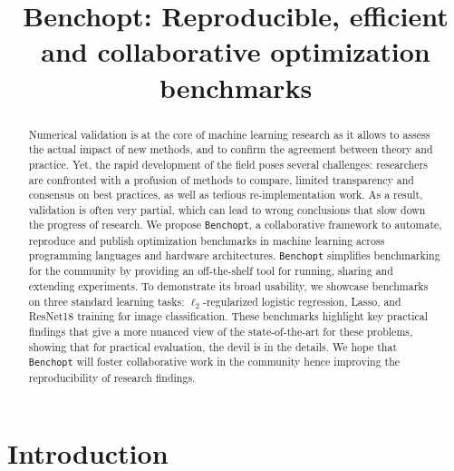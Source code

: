 \documentclass{article}
\title{Benchopt: Reproducible, efficient and collaborative optimization benchmarks}
\author{
  Thomas~Moreau$^{1,*}$,
  Mathurin~Massias$^{2,*}$,
  Alexandre~Gramfort$^{1,*}$,
  Pierre~Ablin$^{3}$,\\
  \textbf{
  Pierre-Antoine~Bannier, Benjamin~Charlier$^{4}$,
  Mathieu~Dagréou$^{1}$,
  Tom~Dupré~la~Tour$^{6}$,}\\
  \textbf{
  Ghislain~Durif$^{4}$,
  Cassio~F.~Dantas$^{7}$,
  Quentin~Klopfenstein$^{8}$,
  Johan~Larsson$^{9}$,
  En~Lai$^{1}$,}\\
  \textbf{
  Tanguy~Lefort$^{4}$,
  Benoit~Malézieux$^{1}$,
  Badr~Moufad$^{2}$,
  Binh~T.~Nguyen$^{10}$,
  Alain~Rakotomamonjy$^{11}$,}\\
  \textbf{
  Zaccharie~Ramzi$^{12}$,
  Joseph~Salmon$^{4,5}$,
  Samuel~Vaiter$^{13}$}\\[1em]
  $^1$ Université Paris-Saclay, Inria, CEA, 91120 Palaiseau, France\\
  $^2$ Univ Lyon, Inria, CNRS, ENS de Lyon, UCB Lyon 1, LIP UMR 5668, F-69342, Lyon, France\\
  $^3$ Université Paris-Dauphine, PSL University, CNRS, 75016, Paris, France\\
  $^4$ IMAG, Univ Montpellier, CNRS, Montpellier, France\quad
  $^{5}$ Institut Universitaire de France (IUF)\\
  \hskip-7ex
  $^6$ University of California, Berkeley, CA 94720, USA\quad
  $^{7}$ TETIS, Univ Montpellier, INRAE, Montpellier, France\\
  $^8$ University of Luxembourg, LCSB, Esch-sur-Alzette, Luxembourg\\
  $^9$ The Department of Statistics, Lund University\quad
  $^{10}$ LTCI, Télécom Paris, 91120 Palaiseau, France\\
  $^{11}$ Criteo AI Lab, Paris, France\quad
  $^{12}$ ENS Ulm, CNRS, UMR 8553, Paris, France\\
  $^{13}$ CNRS \& Université Côte d'Azur, Laboratoire J.A. Dieudonné, CNRS, Nice, France\\
}
\newcommand{\Benchopt}{{{\texttt{Benchopt}}}}
\newlength{\figwidth}
\begin{document}
\maketitle

\vspace{-20pt}
\begin{abstract}
    Numerical validation is at the core of machine learning research as it allows to assess the actual impact of new methods, and to confirm the agreement between theory and practice.
    Yet, the rapid development of the field poses several challenges: researchers are confronted with a profusion of methods to compare, limited transparency and consensus on best practices, as well as tedious re-implementation work.
    As a result, validation is often very partial, which can lead to wrong conclusions that slow down the progress of research.
    We propose \Benchopt{}, a collaborative framework to automate, reproduce and publish optimization benchmarks in machine learning across programming languages and hardware architectures.
    \Benchopt{} simplifies benchmarking for the community by providing an off-the-shelf tool for running, sharing and extending experiments.
    To demonstrate its broad usability, we showcase benchmarks on three standard learning tasks: $\ell_2$-regularized logistic regression, Lasso, and ResNet18 training for image classification.
    These benchmarks highlight key practical findings that give a more nuanced view of the state-of-the-art for these problems, showing that for practical evaluation, the devil is in the details.
    We hope that \Benchopt{} will foster collaborative work in the community hence improving the reproducibility of research findings.
\end{abstract}


\setlength{\figwidth}{\linewidth}




\section{Introduction}
\end{document}
